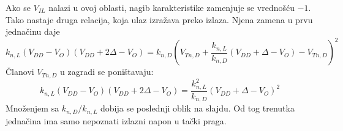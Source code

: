 Ako se $V_{IL}$ nalazi u ovoj oblasti, nagib karakteristike zamenjuje se vrednošću $-1$. Tako nastaje druga relacija, koja ulaz izražava preko izlaza. Njena zamena u prvu jednačinu daje
\[k_{n,L}(V_{DD}-V_O)(V_{DD}+2\Delta-V_O)=k_{n,D}\left(V_{Tn,D}+\frac{k_{n,L}}{k_{n,D}}(V_{DD}+\Delta-V_O)-V_{Tn,D}\right)^2\]
Članovi $V_{Tn,D}$ u zagradi se poništavaju:
\[k_{n,L}(V_{DD}-V_O)(V_{DD}+2\Delta-V_O)=\frac{k_{n,L}^2}{k_{n,D}}(V_{DD}+\Delta-V_O)^2\]
Množenjem sa $k_{n,D}/k_{n,L}$ dobija se poslednji oblik na slajdu. Od tog trenutka jednačina ima samo nepoznati izlazni napon u tački praga.
